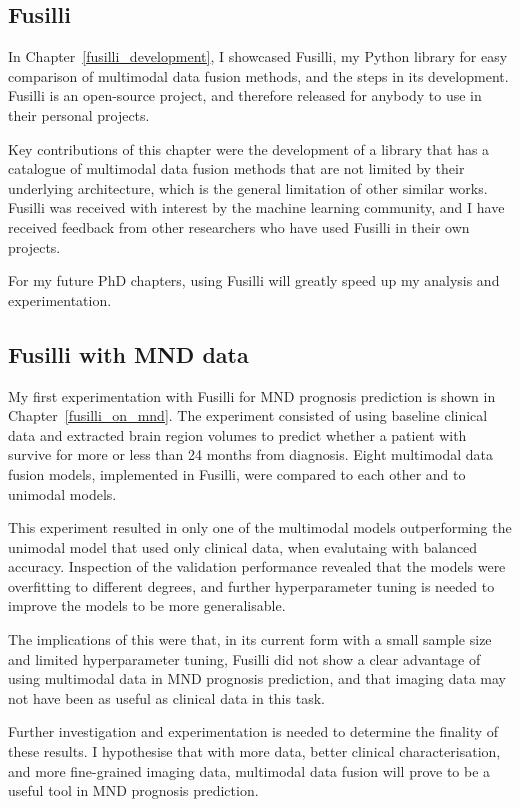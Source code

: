 \subsection{Fusilli}

In Chapter~\ref{fusilli_development}, I showcased Fusilli, my Python library for easy comparison of multimodal data fusion methods, and the steps in its development.
Fusilli is an open-source project, and therefore released for anybody to use in their personal projects.

Key contributions of this chapter were the development of a library that has a catalogue of multimodal data fusion methods that are not limited by their underlying architecture, which is the general limitation of other similar works.
Fusilli was received with interest by the machine learning community, and I have received feedback from other researchers who have used Fusilli in their own projects.

For my future PhD chapters, using Fusilli will greatly speed up my analysis and experimentation.

\subsection{Fusilli with MND data}

My first experimentation with Fusilli for MND prognosis prediction is shown in Chapter~\ref{fusilli_on_mnd}.
The experiment consisted of using baseline clinical data and extracted brain region volumes to predict whether a patient with survive for more or less than 24 months from diagnosis.
Eight multimodal data fusion models, implemented in Fusilli, were compared to each other and to unimodal models.

This experiment resulted in only one of the multimodal models outperforming the unimodal model that used only clinical data, when evalutaing with balanced accuracy.
Inspection of the validation performance revealed that the models were overfitting to different degrees, and further hyperparameter tuning is needed to improve the models to be more generalisable.

The implications of this were that, in its current form with a small sample size and limited hyperparameter tuning, Fusilli did not show a clear advantage of using multimodal data in MND prognosis prediction, and that imaging data may not have been as useful as clinical data in this task.

Further investigation and experimentation is needed to determine the finality of these results.
I hypothesise that with more data, better clinical characterisation, and more fine-grained imaging data, multimodal data fusion will prove to be a useful tool in MND prognosis prediction.

